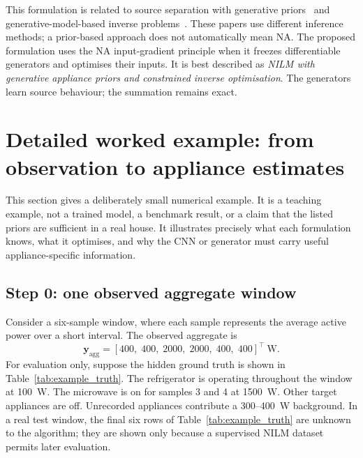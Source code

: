 \documentclass[11pt]{article}
\newcommand{\vect}[1]{\mathbf{#1}}
\begin{document}
This formulation is related to source separation with generative priors~\cite{narayanaswamy2020,jayaram2020} and generative-model-based inverse problems~\cite{bora2017}. These papers use different inference methods; a prior-based approach does not automatically mean NA. The proposed formulation uses the NA input-gradient principle when it freezes differentiable generators and optimises their inputs. It is best described as \emph{NILM with generative appliance priors and constrained inverse optimisation}. The generators learn source behaviour; the summation remains exact.

\section{Detailed worked example: from observation to appliance estimates}

This section gives a deliberately small numerical example. It is a teaching example, not a trained model, a benchmark result, or a claim that the listed priors are sufficient in a real house. It illustrates precisely what each formulation knows, what it optimises, and why the CNN or generator must carry useful appliance-specific information.

\subsection{Step 0: one observed aggregate window}

Consider a six-sample window, where each sample represents the average active power over a short interval. The observed aggregate is
\begin{equation}
    \vect{y}_{\mathrm{agg}}=
    [400,\;400,\;2000,\;2000,\;400,\;400]^{\top}\ \mathrm{W}.
    \label{eq:example_observation}
\end{equation}
For evaluation only, suppose the hidden ground truth is shown in Table~\ref{tab:example_truth}. The refrigerator is operating throughout the window at 100~W. The microwave is on for samples 3 and 4 at 1500~W. Other target appliances are off. Unrecorded appliances contribute a 300--400~W background. In a real test window, the final six rows of Table~\ref{tab:example_truth} are unknown to the algorithm; they are shown only because a supervised NILM dataset permits later evaluation.
\end{document}

